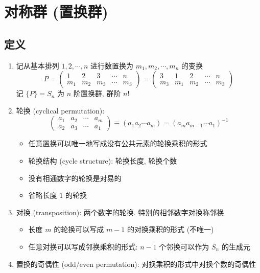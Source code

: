 \documentclass[12pt,a4paper]{article}%
\numberwithin{equation}{section}%
\begin{document}
\section{对称群 (置换群)} %
\label{sec:sym_group}
\subsection{定义} %
\label{sub:sym_def}
\begin{enumerate}
	\item 记从基本排列 $1,2,\cdots, n$ 进行数置换为 $m_1, m_2, \cdots, m_n$ 的变换
	\begin{equation}
		P = \begin{pmatrix}
			1 & 2 & 3 & \cdots & n\\
			m_1 & m_2 & m_3 & \cdots & m_3
		\end{pmatrix} = \begin{pmatrix}
			3 & 1 & 2 & \cdots & n\\
			m_3 & m_1 & m_2 & \cdots & m_3
		\end{pmatrix}
	\end{equation}
	记 $\{P\} = S_n$ 为 $n$ 阶置换群, 群阶 $n!$ 
	\item 轮换 (cyclical permutation): 
	\begin{equation}
		\begin{pmatrix}
			a_1 & a_2 & \cdots & a_m \\
			a_2 & a_3 & \cdots & a_1
		\end{pmatrix}\equiv (a_1 a_2 \cdots a_m) = (a_m a_{m-1} \cdots a_1)^{-1}
	\end{equation}
	\begin{itemize}
		\item 任意置换可以唯一地写成没有公共元素的轮换乘积的形式
		\item 轮换结构 (cycle structure): 轮换长度, 轮换个数
		\item 没有相通数字的轮换是对易的
		\item 省略长度 $1$ 的轮换
	\end{itemize}
	\item 对换 (transposition): 两个数字的轮换. 特别的相邻数字对换称邻换
	\begin{itemize}
		\item 长度 $m$ 的轮换可以写成 $m-1$ 的对换乘积的形式 (不唯一)
		\item 任意对换可以写成邻换乘积的形式: $n-1$ 个邻换可以作为 $S_n$ 的生成元
	\end{itemize}
	\item 置换的奇偶性 (odd/even permutation): 对换乘积的形式中对换个数的奇偶性

\end{enumerate}
\end{document}

